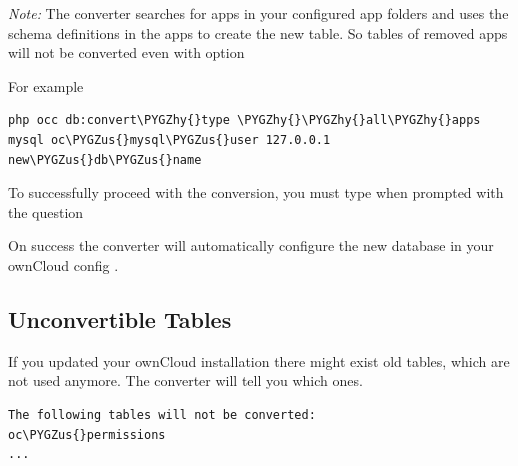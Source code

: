 \documentclass[letterpaper,10pt,english]{sphinxmanual}
\def\PYGZus{\char`\_}
\def\PYGZhy{\char`\-}
\begin{document}
\emph{Note:} The converter searches for apps in your configured app folders and uses
the schema definitions in the apps to create the new table. So tables of removed
apps will not be converted even with option 

For example

\begin{Verbatim}[commandchars=\\\{\}]
php occ db:convert\PYGZhy{}type \PYGZhy{}\PYGZhy{}all\PYGZhy{}apps mysql oc\PYGZus{}mysql\PYGZus{}user 127.0.0.1 new\PYGZus{}db\PYGZus{}name
\end{Verbatim}

To successfully proceed with the conversion, you must type  when prompted
with the question 

On success the converter will automatically configure the new database in your
ownCloud config .


\subsection{Unconvertible Tables}
\label{configuration_database/db_conversion:unconvertible-tables}
If you updated your ownCloud installation there might exist old tables, which
are not used anymore. The converter will tell you which ones.

\begin{Verbatim}[commandchars=\\\{\}]
The following tables will not be converted:
oc\PYGZus{}permissions
...
\end{Verbatim}
\end{document}
